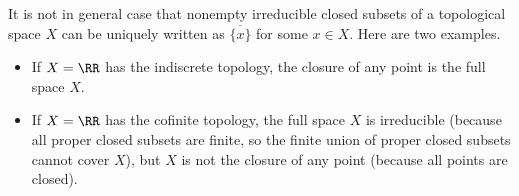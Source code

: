 \documentclass[../notes.tex]{subfiles}
\begin{document}
\begin{remark}
	It is not in general case that nonempty irreducible closed subsets of a topological space $X$ can be uniquely written as $\overline{\{x\}}$ for some $x\in X$. Here are two examples.
	\begin{itemize}
		\item If $X=\RR$ has the indiscrete topology, the closure of any point is the full space $X$.
		\item If $X=\RR$ has the cofinite topology, the full space $X$ is irreducible (because all proper closed subsets are finite, so the finite union of proper closed subsets cannot cover $X$), but $X$ is not the closure of any point (because all points are closed).
	\end{itemize}
\end{remark}
\end{document}
